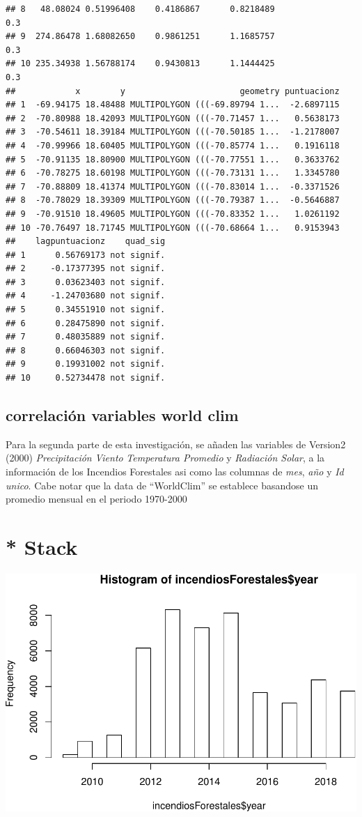 \documentclass[11pt,]{article}
\begin{document}
\begin{verbatim}
## 8   48.08024 0.51996408    0.4186867      0.8218489                   0.3
## 9  274.86478 1.68082650    0.9861251      1.1685757                   0.3
## 10 235.34938 1.56788174    0.9430813      1.1444425                   0.3
##            x        y                       geometry puntuacionz
## 1  -69.94175 18.48488 MULTIPOLYGON (((-69.89794 1...  -2.6897115
## 2  -70.80988 18.42093 MULTIPOLYGON (((-70.71457 1...   0.5638173
## 3  -70.54611 18.39184 MULTIPOLYGON (((-70.50185 1...  -1.2178007
## 4  -70.99966 18.60405 MULTIPOLYGON (((-70.85774 1...   0.1916118
## 5  -70.91135 18.80900 MULTIPOLYGON (((-70.77551 1...   0.3633762
## 6  -70.78275 18.60198 MULTIPOLYGON (((-70.73131 1...   1.3345780
## 7  -70.88809 18.41374 MULTIPOLYGON (((-70.83014 1...  -0.3371526
## 8  -70.78029 18.39309 MULTIPOLYGON (((-70.79387 1...  -0.5646887
## 9  -70.91510 18.49605 MULTIPOLYGON (((-70.83352 1...   1.0261192
## 10 -70.76497 18.71745 MULTIPOLYGON (((-70.68664 1...   0.9153943
##    lagpuntuacionz    quad_sig
## 1      0.56769173 not signif.
## 2     -0.17377395 not signif.
## 3      0.03623403 not signif.
## 4     -1.24703680 not signif.
## 5      0.34551910 not signif.
## 6      0.28475890 not signif.
## 7      0.48035889 not signif.
## 8      0.66046303 not signif.
## 9      0.19931002 not signif.
## 10     0.52734478 not signif.
\end{verbatim}

\subsection{correlación variables world
clim}\label{correlaciuxf3n-variables-world-clim}

Para la segunda parte de esta investigación, se añaden las variables de
Version2 (2000) \emph{Precipitación} \emph{Viento} \emph{Temperatura
Promedio} y \emph{Radiación Solar}, a la información de los Incendios
Forestales asi como las columnas de \emph{mes}, \emph{año} y \emph{Id
unico}. Cabe notar que la data de ``WorldClim'' se establece basandose
un promedio mensual en el periodo 1970-2000

\section{* Stack}\label{stack}

\includegraphics{proyecto_files/figure-latex/unnamed-chunk-30-1.pdf}
\end{document}

